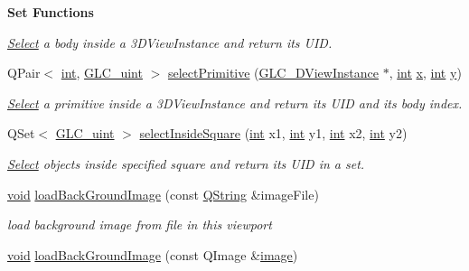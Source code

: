 \begin{Indent}{\bf Set Functions}
\begin{DoxyCompactItemize}
\begin{DoxyCompactList}\small\item\em \hyperlink{class_select}{Select} a body inside a 3\-D\-View\-Instance and return its U\-I\-D. \end{DoxyCompactList}\item 
Q\-Pair$<$ \hyperlink{ioapi_8h_a787fa3cf048117ba7123753c1e74fcd6}{int}, \hyperlink{glc__global_8h_abf950976fabed69026558df8e2da6c6b}{G\-L\-C\-\_\-uint} $>$ \hyperlink{class_g_l_c___viewport_adab3e4f2c42576381804d9a86be0673a}{select\-Primitive} (\hyperlink{class_g_l_c__3_d_view_instance}{G\-L\-C\-\_\-D\-View\-Instance} $\ast$, \hyperlink{ioapi_8h_a787fa3cf048117ba7123753c1e74fcd6}{int} \hyperlink{glext_8h_a1db9d104e3c2128177f26aff7b46982f}{x}, \hyperlink{ioapi_8h_a787fa3cf048117ba7123753c1e74fcd6}{int} \hyperlink{glext_8h_a42315f3ed8fff752bb47fd782309fcfc}{y})
\begin{DoxyCompactList}\small\item\em \hyperlink{class_select}{Select} a primitive inside a 3\-D\-View\-Instance and return its U\-I\-D and its body index. \end{DoxyCompactList}\item 
Q\-Set$<$ \hyperlink{glc__global_8h_abf950976fabed69026558df8e2da6c6b}{G\-L\-C\-\_\-uint} $>$ \hyperlink{class_g_l_c___viewport_ab1fcea3e6e164e66d25ff91ab1181869}{select\-Inside\-Square} (\hyperlink{ioapi_8h_a787fa3cf048117ba7123753c1e74fcd6}{int} x1, \hyperlink{ioapi_8h_a787fa3cf048117ba7123753c1e74fcd6}{int} y1, \hyperlink{ioapi_8h_a787fa3cf048117ba7123753c1e74fcd6}{int} x2, \hyperlink{ioapi_8h_a787fa3cf048117ba7123753c1e74fcd6}{int} y2)
\begin{DoxyCompactList}\small\item\em \hyperlink{class_select}{Select} objects inside specified square and return its U\-I\-D in a set. \end{DoxyCompactList}\item 
\hyperlink{group___u_a_v_objects_plugin_ga444cf2ff3f0ecbe028adce838d373f5c}{void} \hyperlink{class_g_l_c___viewport_af1e0c6151e655d205d03c65c42e36ac0}{load\-Back\-Ground\-Image} (const \hyperlink{group___u_a_v_objects_plugin_gab9d252f49c333c94a72f97ce3105a32d}{Q\-String} \&image\-File)
\begin{DoxyCompactList}\small\item\em load background image from file in this viewport \end{DoxyCompactList}\item 
\hyperlink{group___u_a_v_objects_plugin_ga444cf2ff3f0ecbe028adce838d373f5c}{void} \hyperlink{class_g_l_c___viewport_aa4552ecfaeff397eacb4c28811bf53ef}{load\-Back\-Ground\-Image} (const Q\-Image \&\hyperlink{glext_8h_a4f252db605f5b9117603096756e79824}{image})

\end{DoxyCompactItemize}
\end{Indent}
